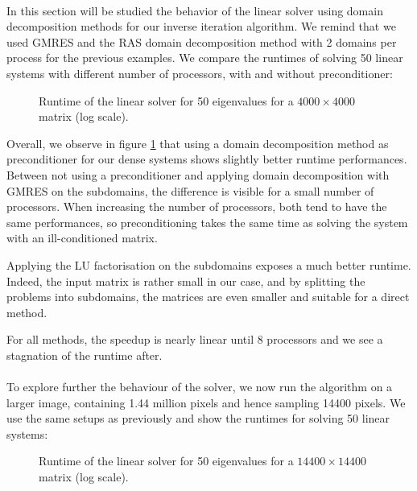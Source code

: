 \paragraph{}
In this section will be studied the behavior of the linear solver using domain decomposition methods for our inverse iteration algorithm.
We remind that we used GMRES and the RAS domain decomposition method with 2 domains per process for the previous examples.
We compare the runtimes of solving 50 linear systems with different number of processors, with and without preconditioner:

\begin{figure}[H]
 \centering
 
 \caption{Runtime of the linear solver for 50 eigenvalues for a \(4000 \times 4000\) matrix (log scale).}
 \label{fig:linear_solver}
\end{figure}

Overall, we observe in figure \ref{fig:linear_solver} that using a domain decomposition method as preconditioner for our dense systems shows slightly better runtime performances.
Between not using a preconditioner and applying domain decomposition with GMRES on the subdomains, the difference is visible for a small number of processors.
When increasing the number of processors, both tend to have the same performances, so preconditioning takes the same time as solving the system with an ill-conditioned matrix.

Applying the LU factorisation on the subdomains exposes a much better runtime.
Indeed, the input matrix is rather small in our case, and by splitting the problems into subdomains, the matrices are even smaller and suitable for a direct method.

For all methods, the speedup is nearly linear until 8 processors and we see a stagnation of the runtime after.

\paragraph{}
To explore further the behaviour of the solver, we now run the algorithm on a larger image, containing 1.44 million pixels and hence sampling 14400 pixels.
We use the same setups as previously and show the runtimes for solving 50 linear systems:

\begin{figure}[H]
 \centering
 
 \caption{Runtime of the linear solver for 50 eigenvalues for a \(14400 \times 14400\) matrix (log scale).}
 \label{fig:linear_solver_big}
\end{figure}


